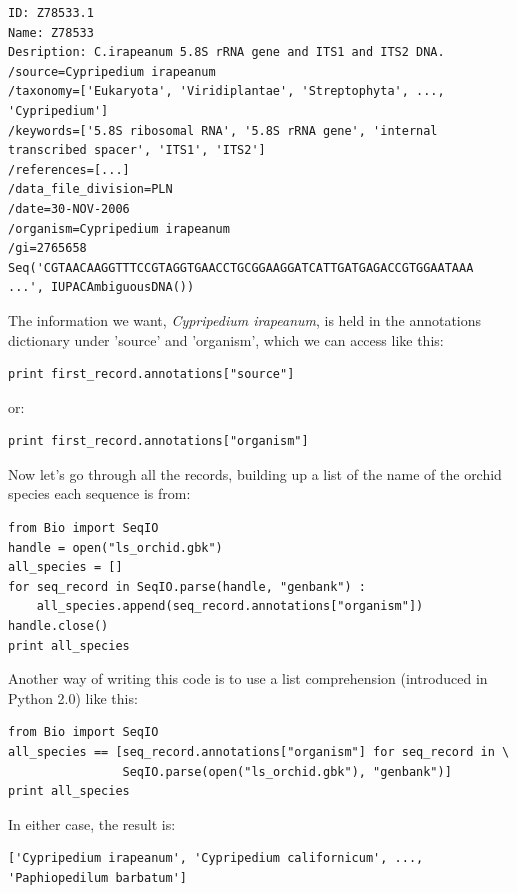 \documentclass{report}
\begin{document}
\begin{verbatim}
ID: Z78533.1
Name: Z78533
Desription: C.irapeanum 5.8S rRNA gene and ITS1 and ITS2 DNA.
/source=Cypripedium irapeanum
/taxonomy=['Eukaryota', 'Viridiplantae', 'Streptophyta', ..., 'Cypripedium']
/keywords=['5.8S ribosomal RNA', '5.8S rRNA gene', 'internal transcribed spacer', 'ITS1', 'ITS2']
/references=[...]
/data_file_division=PLN
/date=30-NOV-2006
/organism=Cypripedium irapeanum
/gi=2765658
Seq('CGTAACAAGGTTTCCGTAGGTGAACCTGCGGAAGGATCATTGATGAGACCGTGGAATAAA ...', IUPACAmbiguousDNA())
\end{verbatim} 

\noindent The information we want, \emph{Cypripedium irapeanum}, is held in the annotations dictionary under 'source' and 'organism', which we can access like this:

\begin{verbatim}
print first_record.annotations["source"]
\end{verbatim} 

\noindent or:

\begin{verbatim}
print first_record.annotations["organism"]
\end{verbatim} 

Now let's go through all the records, building up a list of the name of the orchid species each sequence is from:

\begin{verbatim}
from Bio import SeqIO
handle = open("ls_orchid.gbk")
all_species = []
for seq_record in SeqIO.parse(handle, "genbank") :
    all_species.append(seq_record.annotations["organism"])
handle.close()
print all_species
\end{verbatim} 

Another way of writing this code is to use a list comprehension (introduced in Python 2.0) like this:

\begin{verbatim}
from Bio import SeqIO
all_species == [seq_record.annotations["organism"] for seq_record in \
                SeqIO.parse(open("ls_orchid.gbk"), "genbank")]
print all_species
\end{verbatim}

\noindent In either case, the result is:

\begin{verbatim}
['Cypripedium irapeanum', 'Cypripedium californicum', ..., 'Paphiopedilum barbatum']
\end{verbatim} 
\end{document}
